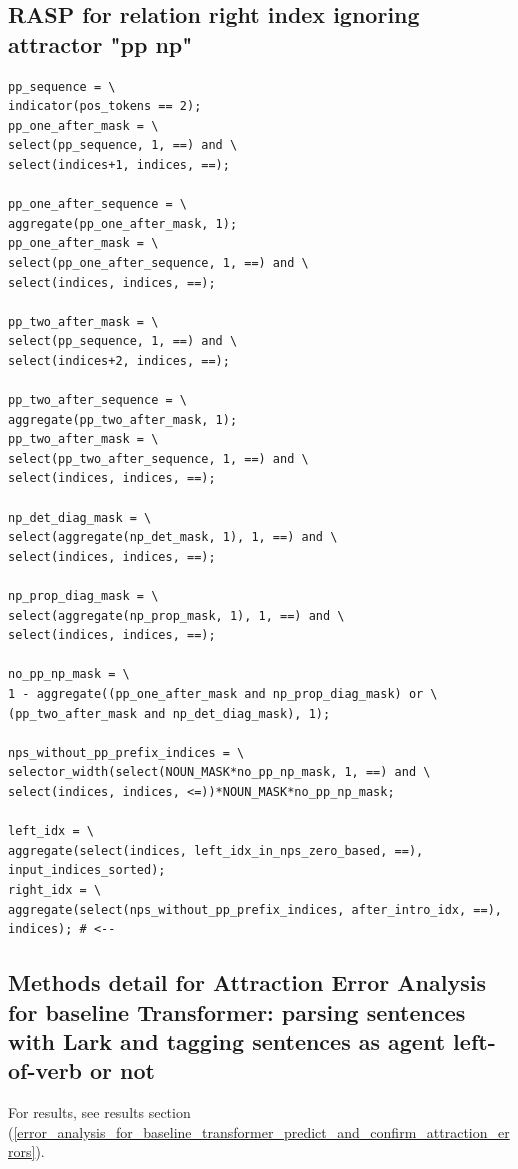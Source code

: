 \documentclass[11pt]{article}
\begin{document}
\subsection{RASP for relation right index ignoring attractor "pp np"}
\label{RASP_for_relation_right_index_ignoring_attractor_pp_np}

\begin{tiny}
\begin{verbatim}
pp_sequence = \
indicator(pos_tokens == 2);
pp_one_after_mask = \
select(pp_sequence, 1, ==) and \
select(indices+1, indices, ==);

pp_one_after_sequence = \
aggregate(pp_one_after_mask, 1);
pp_one_after_mask = \
select(pp_one_after_sequence, 1, ==) and \
select(indices, indices, ==);

pp_two_after_mask = \
select(pp_sequence, 1, ==) and \
select(indices+2, indices, ==);

pp_two_after_sequence = \
aggregate(pp_two_after_mask, 1);
pp_two_after_mask = \
select(pp_two_after_sequence, 1, ==) and \
select(indices, indices, ==);

np_det_diag_mask = \
select(aggregate(np_det_mask, 1), 1, ==) and \
select(indices, indices, ==);

np_prop_diag_mask = \
select(aggregate(np_prop_mask, 1), 1, ==) and \
select(indices, indices, ==);

no_pp_np_mask = \
1 - aggregate((pp_one_after_mask and np_prop_diag_mask) or \
(pp_two_after_mask and np_det_diag_mask), 1);

nps_without_pp_prefix_indices = \
selector_width(select(NOUN_MASK*no_pp_np_mask, 1, ==) and \
select(indices, indices, <=))*NOUN_MASK*no_pp_np_mask;

left_idx = \
aggregate(select(indices, left_idx_in_nps_zero_based, ==), input_indices_sorted);
right_idx = \
aggregate(select(nps_without_pp_prefix_indices, after_intro_idx, ==), indices); # <--
\end{verbatim}
\end{tiny}

\clearpage
\subsection{Methods detail for Attraction Error Analysis for \cite{Wu2023} baseline Transformer: parsing sentences with Lark and tagging sentences as agent left-of-verb or not  }
\label{appendix_error_analysis_for_baseline_transformer_methods}

For results, see results section (\ref{error_analysis_for_baseline_transformer_predict_and_confirm_attraction_errors}).
\end{document}
